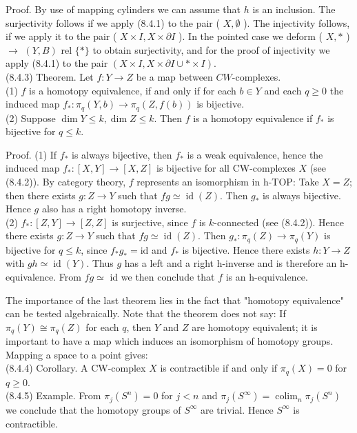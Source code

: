 \documentclass[10pt, letterpaper]{article}
\begin{document}
Proof. By use of mapping cylinders we can assume that $h$ is an inclusion. The surjectivity follows if we apply (8.4.1) to the pair ( $X, \emptyset$ ). The injectivity follows, if we apply it to the pair ( $X \times I, X \times \partial I$ ). In the pointed case we deform ( $X, *$ ) $\rightarrow$ $(Y, B)$ rel $\{*\}$ to obtain surjectivity, and for the proof of injectivity we apply (8.4.1) to the pair $(X \times I, X \times \partial I \cup * \times I)$.\\
(8.4.3) Theorem. Let $f: Y \rightarrow Z$ be a map between $C W$-complexes.\\
(1) $f$ is a homotopy equivalence, if and only if for each $b \in Y$ and each $q \geq 0$ the induced map $f_{*}: \pi_{q}(Y, b) \rightarrow \pi_{q}(Z, f(b))$ is bijective.\\
(2) Suppose $\operatorname{dim} Y \leq k, \operatorname{dim} Z \leq k$. Then $f$ is a homotopy equivalence if $f_{*}$ is bijective for $q \leq k$.

Proof. (1) If $f_{*}$ is always bijective, then $f_{*}$ is a weak equivalence, hence the induced map $f_{*}:[X, Y] \rightarrow[X, Z]$ is bijective for all CW-complexes $X$ (see (8.4.2)). By category theory, $f$ represents an isomorphism in h-TOP: Take $X=Z$; then there exists $g: Z \rightarrow Y$ such that $f g \simeq \operatorname{id}(Z)$. Then $g_{*}$ is always bijective. Hence $g$ also has a right homotopy inverse.\\
(2) $f_{*}:[Z, Y] \rightarrow[Z, Z]$ is surjective, since $f$ is $k$-connected (see (8.4.2)). Hence there exists $g: Z \rightarrow Y$ such that $f g \simeq \operatorname{id}(Z)$. Then $g_{*}: \pi_{q}(Z) \rightarrow \pi_{q}(Y)$ is bijective for $q \leq k$, since $f_{*} g_{*}=\mathrm{id}$ and $f_{*}$ is bijective. Hence there exists $h: Y \rightarrow Z$ with $g h \simeq \operatorname{id}(Y)$. Thus $g$ has a left and a right h-inverse and is therefore an h-equivalence. From $f g \simeq$ id we then conclude that $f$ is an h-equivalence.

The importance of the last theorem lies in the fact that "homotopy equivalence" can be tested algebraically. Note that the theorem does not say: If $\pi_{q}(Y) \cong \pi_{q}(Z)$ for each $q$, then $Y$ and $Z$ are homotopy equivalent; it is important to have a map which induces an isomorphism of homotopy groups. Mapping a space to a point gives:\\
(8.4.4) Corollary. A CW-complex $X$ is contractible if and only if $\pi_{q}(X)=0$ for $q \geq 0$.\\
(8.4.5) Example. From $\pi_{j}\left(S^{n}\right)=0$ for $j<n$ and $\pi_{j}\left(S^{\infty}\right)=\operatorname{colim}_{n} \pi_{j}\left(S^{n}\right)$ we conclude that the homotopy groups of $S^{\infty}$ are trivial. Hence $S^{\infty}$ is contractible.
\end{document}
